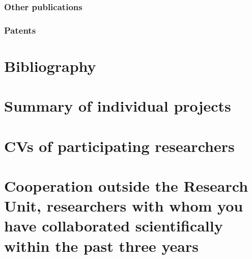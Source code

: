 \documentclass{scrartcl}
\begin{document}
\subsubsection{Other publications}
\printbibliography[category=nonreviewed, heading=none]

\subsubsection{Patents}

\printbibliography[category=patents_pending, heading=none]

\printbibliography[category=patents, heading=none]


\section{Bibliography}
\printbibliography[notcategory=reviewed, notcategory=nonreviewed, notcategory=patents_pending, notcategory=patents, heading=none]


\section{Summary of individual projects}


\section{CVs of participating researchers}


\section{Cooperation outside the Research Unit, researchers with whom you have collaborated scientifically within the past three years}
\end{document}
